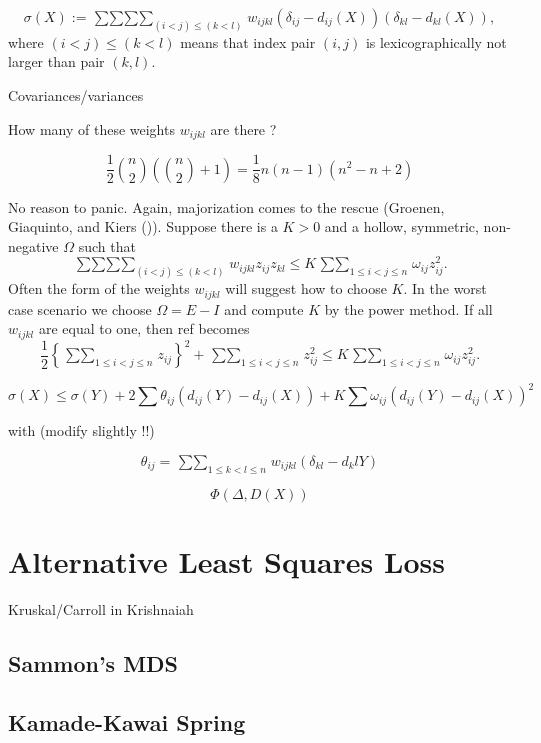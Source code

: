 \documentclass[
  12pt,
  letterpaper,
  DIV=11,
  numbers=noendperiod]{scrreprt}
\theoremstyle{remark}
\begin{document}
\[
\sigma(X):=\mathop{\sum\sum\sum\sum}_{(i<j)\leq(k<l)} w_{ijkl}(\delta_{ij}-d_{ij}(X))(\delta_{kl}-d_{kl}(X)),
\] where \((i<j)\leq(k<l)\) means that index pair \((i,j)\) is
lexicographically not larger than pair \((k,l)\).

Covariances/variances

How many of these weights \(w_{ijkl}\) are there ?

\[
\frac12\binom{n}{2}(\binom{n}{2}+1)=\frac18 n(n-1)(n^2-n+2)
\]

No reason to panic. Again, majorization comes to the rescue (Groenen,
Giaquinto, and Kiers ()).
Suppose there is a \(K>0\) and a hollow, symmetric, non-negative
\(\Omega\) such that \[
\mathop{\sum\sum\sum\sum}_{(i<j)\leq(k<l)} w_{ijkl}z_{ij}z_{kl}\leq K\mathop{\sum\sum}_{1\leq i<j\leq n}\omega_{ij}z_{ij}^2.
\] Often the form of the weights \(w_{ijkl}\) will suggest how to choose
\(K\). In the worst case scenario we choose \(\Omega=E-I\) and compute
\(K\) by the power method. If all \(w_{ijkl}\) are equal to one, then
ref becomes \[
\frac12\left\{\mathop{\sum\sum}_{1\leq i<j\leq n}z_{ij}\right\}^2+
\mathop{\sum\sum}_{1\leq i<j\leq n}z_{ij}^2\leq K\mathop{\sum\sum}_{1\leq i<j\leq n}\omega_{ij}z_{ij}^2.
\]

\[
\sigma(X)\leq\sigma(Y)+2\sum \theta_{ij}(d_{ij}(Y)-d_{ij}(X))+K\sum \omega_{ij}(d_{ij}(Y)-d_{ij}(X))^2
\]

with (modify slightly !!)

\[
\theta_{ij}=\mathop{\sum\sum}_{1\leq k<l\leq n}w_{ijkl}(\delta_{kl}-d_kl{Y})
\]

\[
\Phi(\Delta,D(X))
\]


\chapter{Alternative Least Squares
Loss}\label{alternative-least-squares-loss}

Kruskal/Carroll in Krishnaiah

\section{Sammon's MDS}\label{sammons-mds}

\section{Kamade-Kawai Spring}\label{kamade-kawai-spring}
\end{document}
